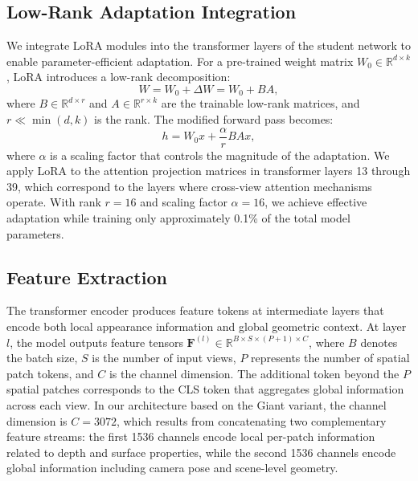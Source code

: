\subsection{Low-Rank Adaptation Integration}

We integrate LoRA modules into the transformer layers of the student network to enable parameter-efficient adaptation. For a pre-trained weight matrix $W_0 \in \mathbb{R}^{d \times k}$, LoRA introduces a low-rank decomposition:
\begin{equation}
W = W_0 + \Delta W = W_0 + BA,
\label{eq:lora}
\end{equation}
where $B \in \mathbb{R}^{d \times r}$ and $A \in \mathbb{R}^{r \times k}$ are the trainable low-rank matrices, and $r \ll \min(d, k)$ is the rank. The modified forward pass becomes:
\begin{equation}
h = W_0 x + \frac{\alpha}{r} BAx,
\label{eq:lora_forward}
\end{equation}
where $\alpha$ is a scaling factor that controls the magnitude of the adaptation. We apply LoRA to the attention projection matrices in transformer layers 13 through 39, which correspond to the layers where cross-view attention mechanisms operate. With rank $r=16$ and scaling factor $\alpha=16$, we achieve effective adaptation while training only approximately 0.1\% of the total model parameters.

\subsection{Feature Extraction}

The transformer encoder produces feature tokens at intermediate layers that encode both local appearance information and global geometric context. At layer $l$, the model outputs feature tensors $\mathbf{F}^{(l)} \in \mathbb{R}^{B \times S \times (P+1) \times C}$, where $B$ denotes the batch size, $S$ is the number of input views, $P$ represents the number of spatial patch tokens, and $C$ is the channel dimension. The additional token beyond the $P$ spatial patches corresponds to the CLS token that aggregates global information across each view. In our architecture based on the Giant variant, the channel dimension is $C = 3072$, which results from concatenating two complementary feature streams: the first 1536 channels encode local per-patch information related to depth and surface properties, while the second 1536 channels encode global information including camera pose and scene-level geometry.


